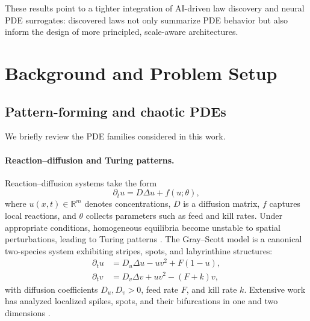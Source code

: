\documentclass{article}
\theoremstyle{plain}
\theoremstyle{definition}
\theoremstyle{remark}
\newcommand{\R}{\mathbb{R}}
\begin{document}
These results point to a tighter integration of AI-driven law discovery and neural PDE surrogates: discovered laws not only summarize PDE behavior but also inform the design of more principled, scale-aware architectures.

\section{Background and Problem Setup}

\subsection{Pattern-forming and chaotic PDEs}

We briefly review the PDE families considered in this work.

\paragraph{Reaction--diffusion and Turing patterns.}
Reaction--diffusion systems take the form
\begin{equation}
    \partial_t u = D \Delta u + f(u;\theta),
\end{equation}
where $u(x,t)\in\R^m$ denotes concentrations, $D$ is a diffusion matrix, $f$ captures local reactions, and $\theta$ collects parameters such as feed and kill rates. Under appropriate conditions, homogeneous equilibria become unstable to spatial perturbations, leading to Turing patterns \citep{Cross1993Pattern,Koch1994BiologicalPattern,Murray2003MathBioII}. The Gray--Scott model \citep{Gray1983Autocatalytic,Gray1984Oscillations,Pearson1993Complex} is a canonical two-species system exhibiting stripes, spots, and labyrinthine structures:
\begin{align}
    \partial_t u &= D_u \Delta u - u v^2 + F(1-u), \\
    \partial_t v &= D_v \Delta v + u v^2 - (F + k) v,
\end{align}
with diffusion coefficients $D_u,D_v>0$, feed rate $F$, and kill rate $k$. Extensive work has analyzed localized spikes, spots, and their bifurcations in one and two dimensions \citep{Doelman1997Localized,Kolokolnikov2005Spike1D,Sun2005TwoSpike,Chen2011GS2DSpots,McGough2004PatternGS,Ward2006AsymptoticRD,Gandy2022GrayScottXPPAUT,Ali2023GrayScottTuring,Cadiot2024GS2DConstructive,Hao2024VariationalGrayScott}.
\end{document}

